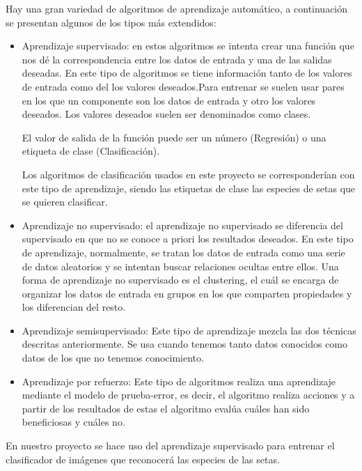 Hay una gran variedad de algoritmos de aprendizaje automático, a continuación se presentan algunos de los tipos más extendidos:
\begin{itemize}

	\item{Aprendizaje supervisado}: en estos algoritmos se intenta crear una función que nos dé la correspondencia entre los datos de entrada y una de las salidas deseadas. En este tipo de algoritmos se tiene información tanto de los valores de entrada como del los valores deseados.Para entrenar se suelen usar pares en los que un componente son los datos de entrada y otro los valores deseados. Los valores deseados suelen ser denominados como clases.~\cite{wiki:aprendizaheSupervisado}
	
	El valor de salida de la función puede ser un número (Regresión) o una etiqueta de clase (Clasificación).
	
	Los algoritmos de clasificación usados en este proyecto se corresponderían con este tipo de aprendizaje, siendo las etiquetas de clase las especies de setas que se quieren clasificar.
	
	\item{Aprendizaje no supervisado}: el aprendizaje no supervisado se diferencia del supervisado en que no se conoce a priori los resultados deseados. En este tipo de aprendizaje, normalmente, se tratan los datos de entrada como una serie de datos aleatorios y se intentan buscar relaciones ocultas entre ellos.
	Una forma de aprendizaje no supervisado es el clustering, el cuál se encarga de organizar los datos de entrada en grupos en los que comparten propiedades y los diferencian del resto.~\cite{wiki:aprendizajeNoSupervisado}
	
	\item{Aprendizaje semisupervisado}: Este tipo de aprendizaje mezcla las dos técnicas descritas anteriormente. Se usa cuando tenemos tanto datos conocidos como datos de los que no tenemos conocimiento.
	
	\item{Aprendizaje por refuerzo}: Este tipo de algoritmos realiza una aprendizaje mediante el modelo de prueba-error, es decir, el algoritmo realiza acciones y a partir de los resultados de estas el algoritmo evalúa cuáles han sido beneficiosas y cuáles no.
\end{itemize}
	
En nuestro proyecto se hace uso del aprendizaje supervisado para entrenar el clasificador de imágenes que reconocerá las especies de las setas.
~\cite{wiki:aprendizajeAutomatico}

